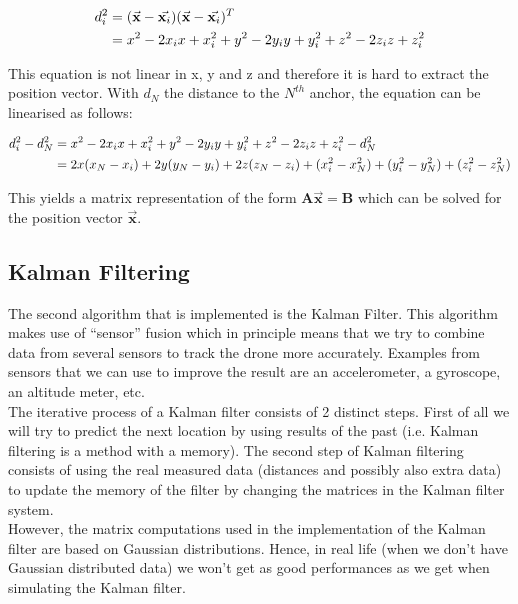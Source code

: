 \documentclass[a4paper]{article}        %
\begin{document}
		\begin{align*}
		\centering
			d_i^2 &= (\vec{\textbf{x}} - \vec{\textbf{x}_i})(\vec{\textbf{x}} - \vec{\textbf{x}_i})^T \\
			&= x^2 - 2x_ix + x_i^2 + y^2 - 2y_iy + y_i^2 + z^2 - 2z_iz + z_i^2
		\end{align*}

		This equation is not linear in x, y and z and therefore it is hard to extract the position vector. With $d_N$ the distance to the $N^{th}$ anchor, the equation can be linearised as follows:

		\begin{align*}
		\centering
			d_i^2 - d_N^2 &= x^2 - 2x_ix + x_i^2 + y^2 - 2y_iy + y_i^2 + z^2 - 2z_iz + z_i^2 - d_N^2 \\
				&= 2x(x_N - x_i) + 2y(y_N - y_i) + 2z(z_N- z_i)+ (x_i^2 - x_N^2) + (y_i^2 - y_N^2)  + (z_i^2 - z_N^2) 
		\end{align*}

		This yields a matrix representation of the form $\textbf{A}\vec{\textbf{x}} = \textbf{B}$ which can be solved for the position vector $\vec{\textbf{x}}$.


	\subsection{Kalman Filtering}
	The second algorithm that is implemented is the Kalman Filter. This algorithm makes use of ``sensor'' fusion which in principle means that we try to combine data from several sensors to track the drone more accurately.
	Examples from sensors that we can use to improve the result are an accelerometer, a gyroscope, an altitude meter, etc.\\
	The iterative process of a Kalman filter consists of 2 distinct steps. First of all we will try to predict the next location by using results of the past (i.e. Kalman filtering is a method with a memory). 
	The second step of Kalman filtering consists of using the real measured data (distances and possibly also extra data) to update the memory of the filter by changing the matrices in the Kalman filter system.\\
	However, the matrix computations used in the implementation of the Kalman filter are based on Gaussian distributions. Hence, in real life (when we don't have Gaussian distributed data) we won't get as good performances as we get when simulating the Kalman filter.
	
\end{document}
